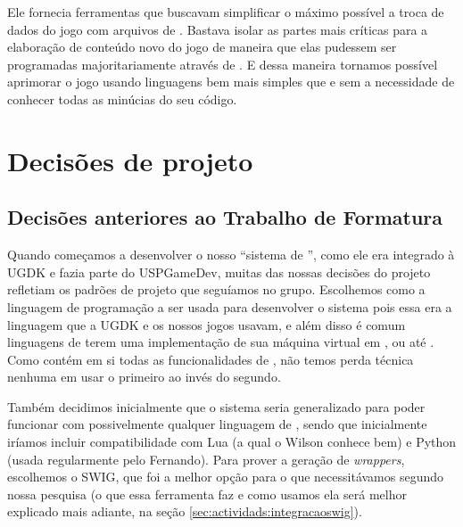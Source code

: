     Ele fornecia ferramentas que buscavam simplificar o máximo possível a
    troca de dados do jogo com arquivos de \script{}. Bastava isolar as
    partes mais críticas para a elaboração de conteúdo novo do jogo de maneira
    que elas pudessem ser programadas majoritariamente através de . E
    dessa maneira tornamos possível aprimorar o jogo usando linguagens bem mais
    simples que \CXX{} e sem a necessidade de conhecer todas as minúcias do seu
    código.


  \section{Decisões de projeto}
  \label{sec:actividads:decisoes}

  \subsection{Decisões anteriores ao Trabalho de Formatura}
  Quando começamos a desenvolver o nosso ``sistema de '',
  como ele era integrado à UGDK e fazia parte do USPGameDev, muitas das
  nossas decisões do projeto refletiam os padrões de projeto que seguíamos
  no grupo. Escolhemos \CXX{} como a linguagem de programação a ser usada
  para desenvolver o sistema pois essa era a linguagem que a UGDK e os nossos
  jogos usavam, e além disso é comum linguagens de \script{} terem uma
  implementação de sua máquina virtual em \C{}, ou até \CXX{}. Como \CXX{}
  contém em si todas as funcionalidades de \C{}, não temos perda técnica nenhuma
  em usar o primeiro ao invés do segundo.
  
  Também decidimos inicialmente que o sistema seria generalizado para poder
  funcionar com possivelmente qualquer linguagem de \script{}, sendo que
  inicialmente iríamos incluir compatibilidade com Lua (a qual o Wilson conhece
  bem) e Python (usada regularmente pelo Fernando). Para prover a geração de 
  \textit{wrappers}, escolhemos o SWIG, que foi a melhor opção para o que 
  necessitávamos segundo nossa pesquisa (o que essa ferramenta faz e como
  usamos ela será melhor explicado mais adiante, na seção \ref{sec:actividads:integracaoswig}).
  
